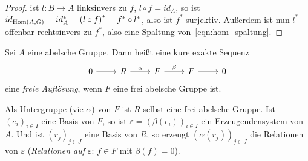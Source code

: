 \begin{proof}
  ist $l \colon B \to A$ linksinvers zu $f$, $l \circ f = id_A$, so ist $id_{\mathrm{Hom}(A,G)} = id_{A}^* = {(l \circ f)}^* = f^* \circ l^*$, also ist $f^*$ surjektiv.
  Außerdem ist nun $l^*$ offenbar rechtsinvers zu $f^*$, also eine Spaltung von~\eqref{eqn:hom_spaltung}.
\end{proof}
\begin{defn}
  Sei $A$ eine abelsche Gruppe.
  Dann heißt eine kure exakte Sequenz
  \begin{equation*}
    \begin{tikzcd}
      0 \arrow{r}{}
        & R \arrow{r}{\alpha}
        & F \arrow{r}{\beta}
        & F \arrow{r}{}
        & 0
    \end{tikzcd}
  \end{equation*}
  eine \emph{freie Auflösung}, wenn $F$ eine frei abelsche Gruppe ist.
\end{defn}
\begin{kommentar}
  Als Untergruppe (vie $\alpha$) von $F$ ist $R$ selbst eine frei abelsche Gruppe.
  Ist ${(e_i)}_{i \in I}$ eine Basis von $F$, so ist $\varepsilon = {(\beta(e_i))}_{i \in I}$ ein Erzeugendensystem von $A$.
  Und ist ${(r_j)}_{j \in J}$ eine Basis von $R$, so erzeugt ${(\alpha(r_j))}_{j \in J}$ die Relationen von $\varepsilon$ (\emph{Relationen auf $\varepsilon$}: $f \in F$ mit $\beta(f) = 0$).
\end{kommentar}
